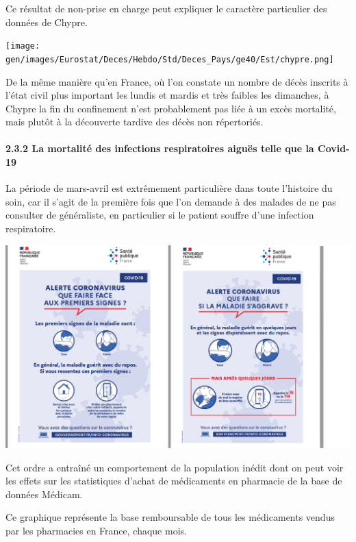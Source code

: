 \documentclass[
]{article}
\begin{document}
Ce résultat de non-prise en charge peut expliquer le caractère
particulier des données de Chypre.

\texttt{[image: gen/images/Eurostat/Deces/Hebdo/Std/Deces\_Pays/ge40/Est/chypre.png]}

De la même manière qu'en France, où l'on constate un nombre de décès
inscrits à l'état civil plus important les lundis et mardis et très
faibles les dimanches, à Chypre la fin du confinement n'est probablement
pas liée à un excès mortalité, mais plutôt à la découverte tardive des
décès non répertoriés.

\hypertarget{la-mortalituxe9-des-infections-respiratoires-aiguuxebs-telle-que-la-covid-19}{%
\paragraph{2.3.2 La mortalité des infections respiratoires aiguës telle
que la
Covid-19}\label{la-mortalituxe9-des-infections-respiratoires-aiguuxebs-telle-que-la-covid-19}}

La période de mars-avril est extrêmement particulière dans toute
l'histoire du soin, car il s'agit de la première fois que l'on demande à
des malades de ne pas consulter de généraliste, en particulier si le
patient souffre d'une infection respiratoire.

\includegraphics[width=10.41667in,height=\textheight]{data/images/flyerspf.png}

Cet ordre a entraîné un comportement de la population inédit dont on
peut voir les effets sur les statistiques d'achat de médicaments en
pharmacie de la base de données Médicam.

Ce graphique représente la base remboursable de tous les médicaments
vendus par les pharmacies en France, chaque mois.
\end{document}
